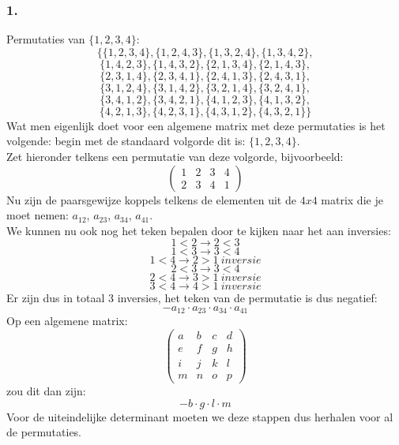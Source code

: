 \documentclass[10pt,a4paper]{article}
\begin{document}
\subsubsection*{1.}
Permutaties van $\{1,2,3,4\}$:
$$
\{\{1, 2, 3, 4\}, \{1, 2, 4, 3\}, \{1, 3, 2, 4\}, \{1, 3, 4, 2\},$$
$$ \{1, 4, 2, 3\}, \{1, 4, 3, 2\}, \{2, 1, 3, 4\}, \{2, 1, 4, 3\}, $$ 
$$\{2, 3, 1, 4\}, \{2, 3, 4, 1\}, \{2, 4, 1, 3\}, \{2, 4, 3, 1\}, $$
$$\{3, 1, 2, 4\}, \{3, 1, 4, 2\}, \{3, 2, 1, 4\}, \{3, 2, 4, 1\}, $$ $$
\{3, 4, 1, 2\}, \{3, 4, 2, 1\}, \{4, 1, 2, 3\}, \{4, 1, 3, 2\}, $$
$$\{4, 2, 1, 3\}, \{4, 2, 3, 1\}, \{4, 3, 1, 2\}, \{4, 3, 2, 1\}\}
$$
Wat men eigenlijk doet voor een algemene matrix met deze permutaties is het volgende: begin met de standaard volgorde dit is: $\{1,2,3,4\}$.\\ Zet hieronder telkens een permutatie van deze volgorde, bijvoorbeeld:
$$\begin{pmatrix}
1 & 2 & 3 & 4\\
2 & 3 & 4 & 1
\end{pmatrix}
$$
Nu zijn de paarsgewijze koppels telkens de elementen uit de $4x4$ matrix die je moet nemen: $a_{12}$, $a_{23}$, $a_{34}$, $a_{41}$.\\
We kunnen nu ook nog het teken bepalen door te kijken naar het aan inversies:\\
$$1 < 2 \rightarrow 2 < 3$$
$$1 < 3 \rightarrow 3 < 4$$
$$1 < 4 \rightarrow 2 > 1 \ inversie$$
$$2 < 3 \rightarrow 3 < 4$$
$$2 < 4 \rightarrow 3 > 1 \ inversie$$
$$3 < 4 \rightarrow 4 > 1 \ inversie$$
Er zijn dus in totaal 3 inversies, het teken van de permutatie is dus negatief:
$$-a_{12}\cdot a_{23}\cdot a_{34}\cdot a_{41}$$
Op een algemene matrix:
$$
\begin{pmatrix}
a & b & c & d\\
e & f & g & h\\
i & j & k & l\\
m & n & o & p
\end{pmatrix}
$$
zou dit dan zijn:
$$-b\cdot g\cdot l\cdot m$$
Voor de uiteindelijke determinant moeten we deze stappen dus herhalen voor al de permutaties.
\end{document}
